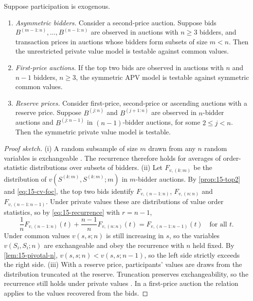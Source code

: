 \begin{theorem}\label{thm:15-ah11}
Suppose participation is exogenous.
\begin{enumerate}[label=(\roman*)]
  \item \emph{Asymmetric bidders.} Consider a second-price auction. Suppose bids $B^{(m-1:n)},\dots,B^{(n-1:n)}$
  are observed in auctions with $n\ge3$ bidders, and transaction prices in auctions whose bidders form subsets of
  size $m<n$. Then the unrestricted private value model is testable against common values.
  \item \emph{First-price auctions.} If the top two bids are observed in auctions with $n$ and $n-1$ bidders,
  $n\ge3$, the symmetric APV model is testable against symmetric common values.
  \item \emph{Reserve prices.} Consider first-price, second-price or ascending auctions with a reserve price.
  Suppose $B^{(j:n)}$ and $B^{(j+1:n)}$ are observed in $n$-bidder auctions and $B^{(j:n-1)}$ in $(n-1)$-bidder
  auctions, for some $2\le j<n$. Then the symmetric private value model is testable.
\end{enumerate}
\end{theorem}

\begin{proof}[Proof sketch]
(i) A random subsample of size $m$ drawn from any $n$ random variables is exchangeable
\citep[proof of Theorem~10]{AtheyHaile2002}. The recurrence therefore holds for averages of order-statistic
distributions over subsets of bidders. (ii) Let $F_{v,(k:m)}$ be the distribution of
$v(S^{(k:m)},S^{(k:m)};m)$ in $m$-bidder auctions. By \cref{prop:15-top2} and \eqref{eq:15-cv-foc}, the top two
bids identify $F_{v,(n-1:n)}$, $F_{v,(n:n)}$ and $F_{v,(n-1:n-1)}$. Under private values these are distributions
of value order statistics, so by \eqref{eq:15-recurrence} with $r=n-1$,
\begin{equation*}
  \frac1nF_{v,(n-1:n)}(t)+\frac{n-1}{n}F_{v,(n:n)}(t)=F_{v,(n-1:n-1)}(t)\quad\text{for all } t .
\end{equation*}
Under common values $v(s,s;n)$ is still increasing in $s$, so the variables $v(S_i,S_i;n)$ are exchangeable and
obey the recurrence with $n$ held fixed. By \cref{lem:15-pivotal-n}, $v(s,s;n)<v(s,s;n-1)$, so the left side
strictly exceeds the right side. (iii) With a reserve price, participants' values are draws from the
distribution truncated at the reserve. Truncation preserves exchangeability, so the recurrence still holds
under private values \citep[proof of Corollary~4]{AtheyHaile2002}. In a first-price auction the relation applies
to the values recovered from the bids.
\end{proof}

